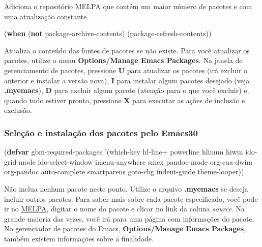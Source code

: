 \documentclass[]{article}
\newenvironment{Shaded}{}{}
\newcommand{\KeywordTok}[1]{\textcolor[rgb]{0.00,0.44,0.13}{\textbf{{#1}}}}
\newcommand{\FunctionTok}[1]{\textcolor[rgb]{0.02,0.16,0.49}{{#1}}}
\newcommand{\NormalTok}[1]{{#1}}
\begin{document}
Adiciona o repositório MELPA que contém um maior número de pacotes e com
uma atualização constante.

\begin{Shaded}
\begin{Highlighting}[]
\NormalTok{(}\KeywordTok{when} \NormalTok{(}\KeywordTok{not} \NormalTok{package-archive-contents)}
  \NormalTok{(package-refresh-contents))}
\end{Highlighting}
\end{Shaded}

Atualiza o conteúdo das fontes de pacotes se não existe. Para você
atualizar os pacotes, utilize o menu \textbf{Options/Manage Emacs
Packages}. Na janela de gerenciamento de pacotes, pressione \textbf{U}
para atualizar os pacotes (irá excluir o anterior e instalar a versão
nova), \textbf{I} para instalar algum pacotes desejado (veja
\textbf{.myemacs}), \textbf{D} para excluir algum pacote (atenção para o
que você excluir) e, quando tudo estiver pronto, pressione \textbf{X}
para executar as ações de inclusão e exclusão.

\subsubsection{Seleção e instalação dos pacotes pelo
Emacs30}\label{seleuxe7uxe3o-e-instalauxe7uxe3o-dos-pacotes-pelo-emacs30}

\begin{Shaded}
\begin{Highlighting}[]
\NormalTok{(}\KeywordTok{defvar}\FunctionTok{ gbm-required-packages}
  \NormalTok{'(which-key}
    \NormalTok{hl-line+}
    \NormalTok{powerline}
    \NormalTok{hlinum}
    \NormalTok{hiwin}
    \NormalTok{ido-grid-mode}
    \NormalTok{ido-select-window}
    \NormalTok{imenu-anywhere}
    \NormalTok{smex}
    \NormalTok{pandoc-mode}
    \NormalTok{org-cua-dwim}
    \NormalTok{org-pandoc}
    \NormalTok{auto-complete}
    \NormalTok{smartparens}
    \NormalTok{goto-chg}
    \NormalTok{indent-guide}
    \NormalTok{theme-looper))}
\end{Highlighting}
\end{Shaded}

Não inclua nenhum pacote neste ponto. Utilize o arquivo
\textbf{.myemacs} se deseja incluir outros pacotes. Para saber mais
sobre cada pacote especificado, você pode ir no
\href{https://melpa.org/}{MELPA}, digitar o nome do pacote e clicar no
link da coluna \emph{source}. Na grande maioria das vezes, você irá para
uma página com informações do pacote. No gerenciador de pacotes do
Emacs, \textbf{Options/Manage Emacs Packages}, também existem
informações sobre a finalidade.
\end{document}
